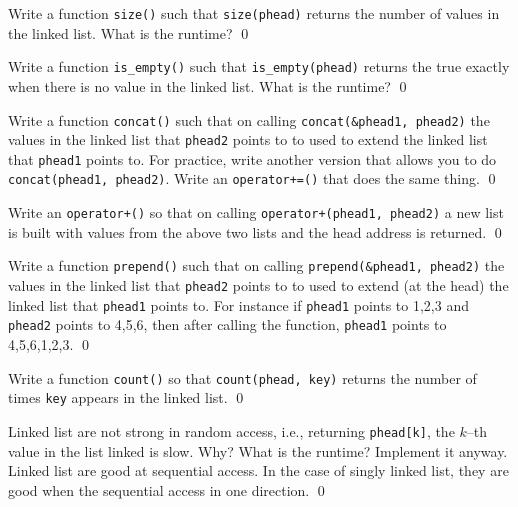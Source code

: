 \begin{ex}
Write a function \verb!size()! such that
\verb!size(phead)! returns the number of values in the linked list.
What is the runtime?
\qed
\end{ex}


\begin{ex}
Write a function \verb!is_empty()! such that
\verb!is_empty(phead)! returns the true exactly when
there is no value in the linked list.
What is the runtime?
\qed
\end{ex}


\begin{ex}
Write a function \texttt{concat()} such that
on calling \texttt{concat(\&phead1, phead2)}
the values in the linked list that \texttt{phead2} points to
to used to extend the linked list that
\texttt{phead1} points to.
For practice, write another version that allows you to do
\texttt{concat(phead1, phead2)}.
Write an \texttt{operator+=()} that does the same thing.
\qed
\end{ex}

\begin{ex}
Write an \texttt{operator+()} so that on calling
\texttt{operator+(phead1, phead2)}
a new list is built with values from the above two lists
and the head address is returned.
\qed
\end{ex}
  

\begin{ex}
Write a function \texttt{prepend()} such that
on calling \texttt{prepend(\&phead1, phead2)}
the values in the linked list that \texttt{phead2} points to
to used to extend (at the head) the linked list that
\verb!phead1! points to.
For instance if
\texttt{phead1} points to 1,2,3
and
\texttt{phead2} points to 4,5,6,
then after calling the function,
\texttt{phead1} points to 4,5,6,1,2,3.
\qed
\end{ex}


\begin{ex}
  Write a function \texttt{count()} so that
  \texttt{count(phead, key)} returns the number of times \texttt{key}
  appears in the linked list.
  \qed
\end{ex}


\begin{ex}
  Linked list are not strong in random access, i.e.,
  returning \texttt{phead[k]}, the $k$--th value in the list linked
  is slow.
  Why? What is the runtime?
  Implement it anyway.
  Linked list are good at sequential access. In the case of singly
  linked list, they are good when the sequential access in one direction.
  \qed
\end{ex}

